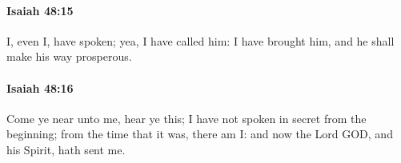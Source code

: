 		\paragraph{Isaiah 48:15} %
			\label{ISAIAH-48-15}

			I, even I, have spoken; yea, I have called him: I have brought him, and he shall make his way prosperous.


		\paragraph{Isaiah 48:16} %
			\label{ISAIAH-48-16}

			Come ye near unto me, hear ye this; I have not spoken in secret from the beginning; from the time that it was, there am I: and now the Lord GOD, and his Spirit, hath sent me.


